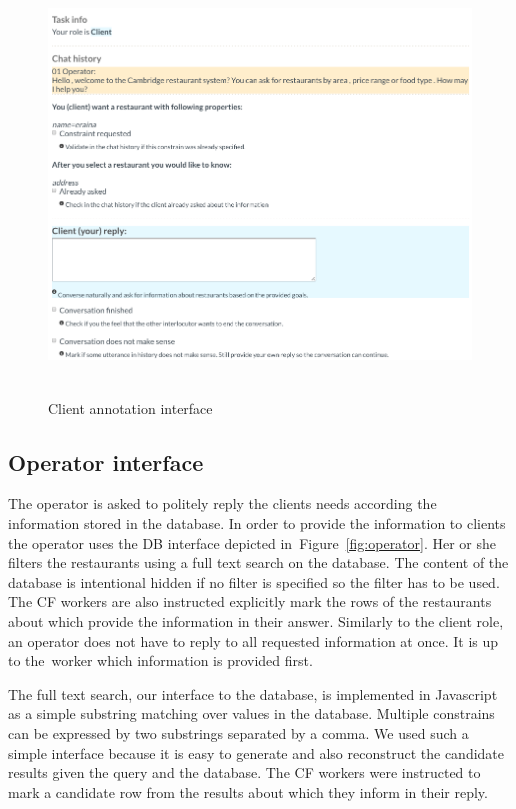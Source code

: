 \documentclass[runningheads,a4paper]{llncs}
\begin{document}
\begin{figure}
\vspace{-1.00em}
\begin{center}
\includegraphics[height=30em]{gui-annotators-client}
\caption{Client annotation interface}
\end{center}
\vspace{-1.00em}
\label{fig:client}
\end{figure}
\vspace{-1.00em}

\vspace{-1.00em}
\subsection{Operator interface}
\label{sec:operator}
The operator is asked to politely reply the clients needs according the information stored in the database.
In order to provide the information to clients the operator uses the DB interface depicted in~Figure~\ref{fig:operator}.
Her or she filters the restaurants using a full text search on the database.
The content of the database is intentional hidden if no filter is specified so the filter has to be used.
The CF workers are also instructed explicitly mark the rows of the restaurants about which provide the information in their answer.
Similarly to the client role, an operator does not have to reply to all requested information at once.
It is up to the~worker which information is provided first.

The full text search, our interface to the database, is implemented in Javascript as a simple substring matching over values in the database.
Multiple constrains can be expressed by two substrings separated by a comma.
We used such a simple interface because it is easy to generate and also reconstruct the candidate results given the query and the database.
The CF workers were instructed to mark a candidate row from the results about which they inform in their reply.
\end{document}
